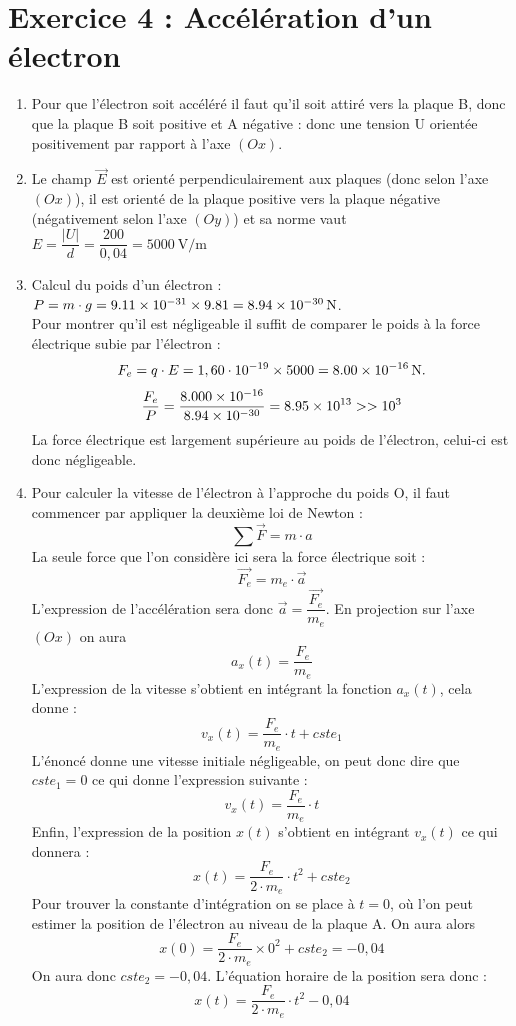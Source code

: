 \documentclass[a4paper,11pt,fleqn]{article}%
\begin{document}
\section*{Exercice 4 : Accélération d'un électron}
\begin{enumerate}
	\item  Pour que l'électron soit accéléré il faut qu'il soit attiré vers la plaque B, donc que la plaque B soit positive et A négative : donc une tension U orientée positivement par rapport à l'axe $(Ox)$.
	\item Le champ $\vec{E}$ est orienté perpendiculairement aux plaques (donc selon l'axe $(Ox)$), il est orienté de la plaque positive vers la plaque négative (négativement selon l'axe $(Oy)$) et sa norme vaut $E = \dfrac{|U|}{d} = \dfrac{200}{0,04} = \SI{5000}{\volt \per \meter}$
	\item Calcul du poids d'un électron : $P = m \cdot g = \num{9,11E-31} \times \num{9,81} = \SI{8,94E-30}{\newton}$.\\
Pour montrer qu'il est négligeable il suffit de comparer le poids à la force électrique subie par l'électron : $$F_e = q \cdot E = 1,60 \cdot 10^{-19} \times 5000 = \SI{8,00E-16}{\newton}.$$
$$\dfrac{F_e}{P} = \dfrac{\num{8,000E-16}}{\num{8,94E-30}} =  \num{8,95E13} >> 10^{3}$$ La force électrique est largement supérieure au poids de l'électron, celui-ci est donc négligeable.
	\item Pour calculer la vitesse de l'électron à l'approche du poids O, il faut commencer par appliquer la deuxième loi de Newton : $$\sum \vec{F} = m \cdot {a}$$
	La seule force que l'on considère ici sera la force électrique soit : $$\vec{F_e} = m_e \cdot \vec{a}$$
	L'expression de l'accélération sera donc $\vec{a} = \dfrac{\vec{F_e}}{m_e}$. En projection sur l'axe $(Ox)$ on aura $$a_x(t) = \dfrac{F_e}{m_e}$$
L'expression de la vitesse s'obtient en intégrant la fonction $a_x(t)$, cela donne : $$v_x(t) = \dfrac{F_e}{m_e} \cdot t + cste_1$$
L'énoncé donne une vitesse initiale négligeable, on peut donc dire que $cste_1 = 0$ ce qui donne l'expression suivante : $$v_x(t) = \frac{F_e}{m_e} \cdot t$$
Enfin, l'expression de la position $x(t)$ s'obtient en intégrant $v_x(t)$ ce qui donnera : $$x(t) = \dfrac{F_e}{2 \cdot m_e} \cdot t^2 + cste_2$$
Pour trouver la constante d'intégration on se place à $t=0$, où l'on peut estimer la position de l'électron au niveau de la plaque A. On aura alors $$x(0) = \dfrac{F_e}{2 \cdot m_e} \times 0^2 + cste_2= -0,04$$
On aura donc $cste_2 = -0,04$. L'équation horaire de la position sera donc : $$x(t) = \dfrac{F_e}{2 \cdot m_e} \cdot t^2 - 0,04$$


\end{enumerate}
\end{document}

